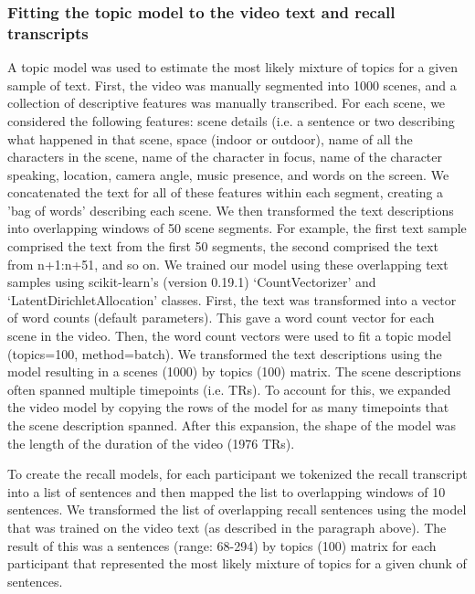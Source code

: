 \documentclass{article}
\begin{document}
{\subsubsection{Fitting the topic model to the video text and recall transcripts}
A topic model was used to estimate the most likely mixture of topics for a given sample of text. First, the video was manually segmented into 1000 scenes, and a collection of descriptive features was manually transcribed. For each scene, we considered the following features: scene details (i.e. a sentence or two describing what happened in that scene, space (indoor or outdoor), name of all the characters in the scene, name of the character in focus, name of the character speaking, location, camera angle, music presence, and words on the screen. We concatenated the text for all of these features within each segment, creating a 'bag of words' describing each scene. We then transformed the text descriptions into overlapping windows of 50 scene segments. For example, the first text sample comprised the text from the first 50 segments, the second comprised the text from n+1:n+51, and so on. We trained our model using these overlapping text samples using scikit-learn's (version 0.19.1) `CountVectorizer' and `LatentDirichletAllocation' classes.  First, the text was transformed into a vector of word counts (default parameters). This gave a word count vector for each scene in the video.  Then, the word count vectors were used to fit a topic model (topics=100, method=batch). We transformed the text descriptions using the model resulting in a scenes (1000) by topics (100) matrix. The scene descriptions often spanned multiple timepoints (i.e. TRs). To account for this, we expanded the video model by copying the rows of the model for as many timepoints that the scene description spanned. After this expansion, the shape of the model was the length of the duration of the video (1976 TRs).

To create the recall models, for each participant we tokenized the recall transcript into a list of sentences and then mapped the list to overlapping windows of 10 sentences.  We transformed the list of overlapping recall sentences using the model that was trained on the video text (as described in the paragraph above). The result of this was a sentences (range: 68-294) by topics (100) matrix for each participant that represented the most likely mixture of topics for a given chunk of sentences.

}
\end{document}
